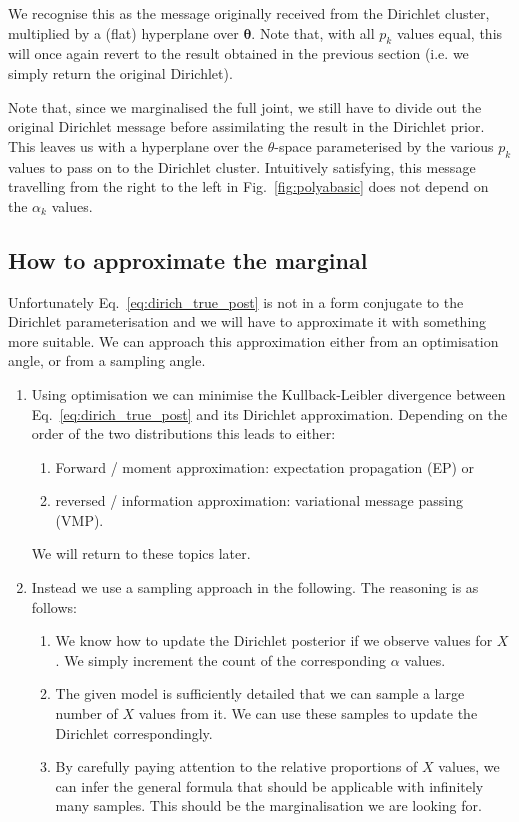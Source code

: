 \documentclass[oneside,english]{scrbook}
\begin{document}
We recognise this as the message originally received from the
Dirichlet cluster, multiplied by a (flat) hyperplane over
$\bm{\theta}$. Note that, with all $p_k$ values equal, this will once
again revert to the result obtained in the previous section (i.e. we
simply return the original Dirichlet).

Note that, since we marginalised the full joint, we still have to
divide out the original Dirichlet message before assimilating the
result in the Dirichlet prior. This leaves us with a hyperplane over
the $\theta$-space parameterised by the various $p_k$ values to pass
on to the Dirichlet cluster. Intuitively satisfying, this message
travelling from the right to the left in Fig.~\ref{fig:polyabasic}
does not depend on the $\alpha_k$ values.

\subsection{How to approximate the marginal}
Unfortunately Eq.~\ref{eq:dirich_true_post} is not in a form conjugate
to the Dirichlet parameterisation and we will have to approximate it
with something more suitable.  We can approach this approximation
either from an optimisation angle, or from a sampling angle.

\begin{enumerate}
\item Using optimisation we can minimise the Kullback-Leibler divergence
  between Eq.~\ref{eq:dirich_true_post} and its Dirichlet
  approximation. Depending on the order of the two distributions this
  leads to either:
  \begin{enumerate}
  \item Forward / moment approximation: expectation propagation (EP)
    or
  \item reversed / information approximation: variational message
    passing (VMP).
  \end{enumerate}
  We will return to these topics later.
\item Instead we use a sampling approach in the following. The reasoning is as
  follows:
  \begin{enumerate}
  \item We know how to update the Dirichlet posterior if we observe
    values for $X$. We simply increment the count of the
    corresponding $\alpha$ values.
  \item The given model is sufficiently detailed that we can sample a
    large number of $X$ values from it. We can use these samples to
    update the Dirichlet correspondingly.
  \item By carefully paying attention to the relative proportions of
    $X$ values, we can infer the general formula that should be
    applicable with infinitely many samples.  This should be the
    marginalisation we are looking for.
  \end{enumerate}
\end{enumerate}
\end{document}
